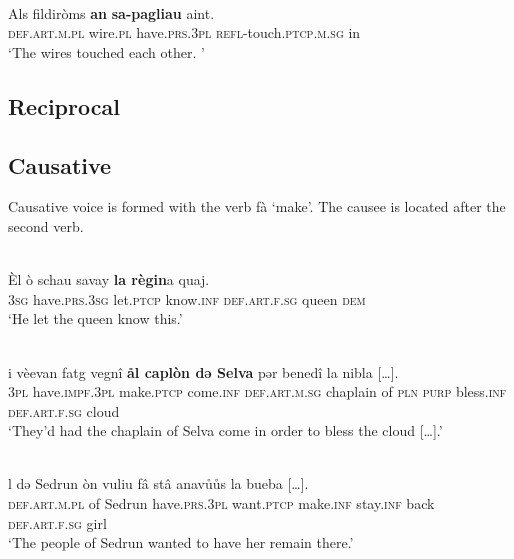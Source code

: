 \ea\label{}
\\
\gll   Als fildiròms \textbf{an} \textbf{sa-pagliau} aint.\\
    \textsc{def.art.m.pl} wire.\textsc{pl} have.\textsc{prs.3pl} \textsc{refl}-touch.\textsc{ptcp.m.sg} in \\
\glt `The wires touched each other. '
\z


\subsection{Reciprocal}

\subsection{Causative}
Causative voice is formed with the verb fà ‘make’. The causee is located after the second verb.

\ea\label{}
\\
\gll    Èl ò schau savay \textbf{la règin}a quaj.\\
     \textsc{3sg} have.\textsc{prs.3sg} let.\textsc{ptcp} know.\textsc{inf} \textsc{def.art.f.sg} queen \textsc{dem}\\
\glt `He let the queen know this.'
\z

\ea\label{ex:1:}
 {\citealt[62]{Büchli1966}}\\
\gll    […] i vèevan fatg vegnî \textbf{ål caplòn dǝ Selva} pǝr benedî la nibla […].\\
    [...]   \textsc{3pl} have.\textsc{impf.3pl} make.\textsc{ptcp} come.\textsc{inf} \textsc{def.art.m.sg} chaplain of \textsc{pln} \textsc{purp} bless.\textsc{inf} \textsc{def.art.f.sg} cloud\\
\glt `They’d had the chaplain of Selva come in order to bless the cloud […].'
\z

\ea\label{ex:1:}
 {\citealt[131]{Büchli1966}}\\
\gll     l də Sedrun òn vuliu fâ stâ anavůůs la bueba […].\\ %
   \textsc{def.art.m.pl} of Sedrun have.\textsc{prs.3pl} want.\textsc{ptcp} make.\textsc{inf} stay.\textsc{inf} back \textsc{def.art.f.sg} girl\\
\glt `The people of Sedrun wanted to have her remain there.'
\z

